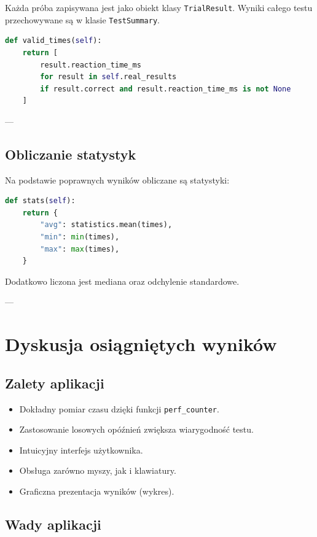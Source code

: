 \documentclass[12pt,a4paper]{article}
\begin{document}
Każda próba zapisywana jest jako obiekt klasy \texttt{TrialResult}. Wyniki całego testu przechowywane są w klasie \texttt{TestSummary}.

\begin{lstlisting}[language=Python, caption=Filtracja poprawnych wyników]
def valid_times(self):
    return [
        result.reaction_time_ms
        for result in self.real_results
        if result.correct and result.reaction_time_ms is not None
    ]
\end{lstlisting}

---

\subsection{Obliczanie statystyk}

Na podstawie poprawnych wyników obliczane są statystyki:

\begin{lstlisting}[language=Python, caption=Obliczanie statystyk]
def stats(self):
    return {
        "avg": statistics.mean(times),
        "min": min(times),
        "max": max(times),
    }
\end{lstlisting}

Dodatkowo liczona jest mediana oraz odchylenie standardowe.

---

\section{Dyskusja osiągniętych wyników}

\subsection{Zalety aplikacji}

\begin{itemize}
    \item Dokładny pomiar czasu dzięki funkcji \texttt{perf\_counter}.
    \item Zastosowanie losowych opóźnień zwiększa wiarygodność testu.
    \item Intuicyjny interfejs użytkownika.
    \item Obsługa zarówno myszy, jak i klawiatury.
    \item Graficzna prezentacja wyników (wykres).
\end{itemize}

\subsection{Wady aplikacji}
\end{document}
